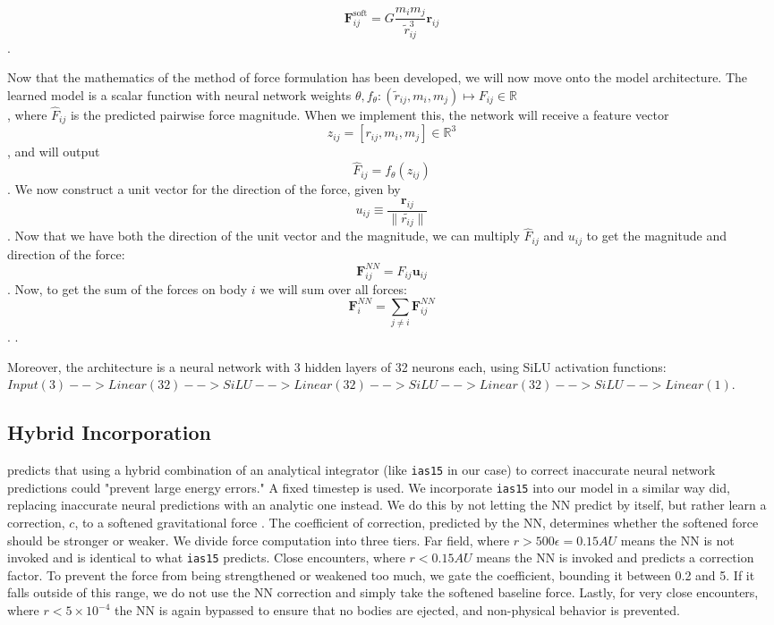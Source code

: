 \documentclass{article}
\begin{document}
\begin{multicols}{2}
$$\mathbf{F}_{ij}^{\text{soft}} = G \frac{m_i m_j}{\tilde{r}_{ij}^3} \mathbf{r}_{ij}$$.

Now that the mathematics of the method of force formulation has been developed, we will now move onto the model architecture. The learned model is a scalar function with neural network weights $\theta, $$f_{\theta} : (\tilde{r}_{ij}, m_i, m_j) \mapsto F_{ij} \in \mathbb{R}$$$$$, where $\hat{F}_{ij}$ is the predicted pairwise force magnitude. When we implement this, the network will receive a feature vector $$z_{ij} = [r_{ij}, m_i, m_j] \in \mathbb{R}^3$$, and will output $$\hat{F}_{ij} = f_{\theta}(z_{ij})$$. We now construct a unit vector for the direction of the force, given by $$u_{ij} \equiv \frac{\mathbf{r}_{ij}}{\|\tilde{r_{ij}}\|}$$. Now that we have both the direction of the unit vector and the magnitude, we can multiply $\hat{F}_{ij}$ and $u_{ij}$ to get the magnitude and direction of the force: $$\mathbf{F}_{ij}^{NN} = F_{ij} \mathbf{u}_{ij}$$. Now, to get the sum of the forces on body $i$ we will sum over all forces: $$\mathbf{F}_{i}^{NN} = \sum_{j \neq i} \mathbf{F}_{ij}^{NN}$$. \cite{kipf2018neural}.

Moreover, the architecture is a neural network with 3 hidden layers of 32 neurons each, using SiLU activation functions:
$Input(3) --> Linear (32) --> SiLU --> Linear (32) --> SiLU --> Linear(32) --> SiLU --> Linear(1)$.

\subsection{Hybrid Incorporation}
\cite{ulibarrena2024hybrid} predicts that using a hybrid combination of an analytical integrator (like \texttt{ias15} in our case) to correct inaccurate neural network predictions could "prevent large energy errors." A fixed timestep is used. We incorporate \texttt{ias15} into our model in a similar way \cite{ulibarrena2024hybrid} did, replacing inaccurate neural predictions with an analytic one instead. We do this by not letting the NN predict by itself, but rather learn a correction, $c$, to a softened gravitational force \cite{kipf2018neural}. The coefficient of correction, predicted by the NN, determines whether the softened force should be stronger or weaker. We divide force computation into three tiers. Far field, where $r > 500\epsilon = 0.15AU$ means the NN is not invoked and is identical to what \texttt{ias15} predicts. Close encounters, where $r < 0.15AU$ means the NN is invoked and predicts a correction factor. To prevent the force from being strengthened or weakened too much, we gate the coefficient, bounding it between 0.2 and 5. If it falls outside of this range, we do not use the NN correction and simply take the softened baseline force. Lastly, for very close encounters, where $r < 5\times10^{-4}$ the NN is again bypassed to ensure that no bodies are ejected, and non-physical behavior is prevented.


\end{multicols}
\end{document}
